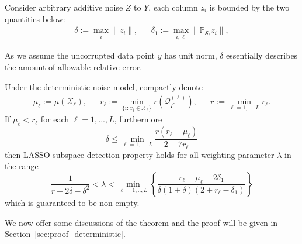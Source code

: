\documentclass{ctexart}
\begin{document}
\begin{definition}
Consider arbitrary additive noise $Z$ to $Y$, each column $z_i$ is bounded by the two quantities below:
\begin{align*}
  \delta:= \max_i\|z_i\|, && \delta_1:=\max_{i,\ell}\|\mathbb{P}_\mathcal{S_{\ell}}z_i\|,
\end{align*}
\end{definition}
As we assume the uncorrupted data point $y$ has unit norm, $\delta$ essentially describes the amount of allowable relative error.


\begin{theorem}\label{thm:thm_general}
Under the deterministic noise model, compactly denote
\begin{align*}
\mu_{\ell}:=\mu(\mathcal{X}_{\ell}),&& r_{\ell}:=\min_{\{i: x_i\in \mathcal{X}_{\ell}\}}r(\mathcal{Q}^{(\ell)}_{I^c}),&&
   r:=\min_{\ell=1,...,L} r_{\ell}.
\end{align*}
If $\mu_{\ell}< r_{\ell}$ for each $\ell = 1,...,L$, furthermore
$$ \delta\leq \min_{\ell=1,...,L}\frac{r(r_{\ell}-\mu_{\ell})}{2+7r_{\ell}} $$
then LASSO subspace detection property holds for all weighting parameter $\lambda$ in the range
\begin{equation*}
\frac{1}{r - 2\delta-\delta^2}<
        \lambda<\min_{\ell=1,..,L}\left\{\frac{r_{\ell}-\mu_{\ell}-2\delta_1}{\delta(1+\delta)(2+r_{\ell}-\delta_1)}\right\}
\end{equation*}
which is guaranteed to be non-empty.
\end{theorem}
We now offer some discussions of the theorem and the proof will be given in  Section~\ref{sec:proof_deterministic}.
\end{document}
